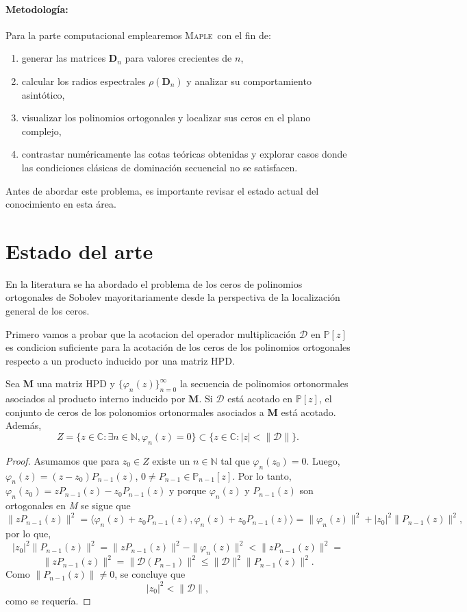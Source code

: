\paragraph{Metodología: }
Para la parte computacional emplearemos
\textsc{Maple}\, con el fin de:
\begin{enumerate}
	\item generar las matrices \(\mathbf{D}_{n}\) para valores crecientes de \(n\),
	\item calcular los radios espectrales $\rho(\mathbf{D}_{n})$ y analizar su comportamiento asintótico,
	\item visualizar los polinomios ortogonales y localizar sus ceros en el plano complejo,
	\item contrastar numéricamente las cotas teóricas obtenidas y explorar casos donde las condiciones clásicas de dominación secuencial no se satisfacen.
\end{enumerate}

Antes de abordar este problema, es importante revisar el estado actual del conocimiento en esta área.

\section{Estado del arte}

En la literatura se ha abordado el problema de los ceros de polinomios ortogonales de Sobolev mayoritariamente desde la perspectiva de la localización general de los ceros.

Primero vamos a probar que la acotacion del operador multiplicación $\mathcal{D}$ en $\mathbb{P}[z]$ es condicion suficiente para la acotación de los ceros de los polinomios ortogonales respecto a un producto inducido por una matriz HPD.

\begin{proposition}\label{prop:bounded_zeros}
	\cite{escribano2025boundedness} Sea \textbf{M} una matriz HPD y $\{\varphi_n(z)\}_{n=0}^{\infty}$ la secuencia de polinomios ortonormales asociados al producto interno inducido por \textbf{M}. Si $\mathcal{D}$ está acotado en $\mathbb{P}[z]$, el conjunto de ceros de los polonomios ortonormales asociados a \textbf{M} está acotado. Además,
	$$Z=\{z\in\mathbb{C}: \exists n \in \mathbb{N},\varphi_n(z)=0\} \subset \{z\in\mathbb{C}:|z|<\|\mathcal{D}\|\}.$$
\end{proposition}

\begin{proof}
	Asumamos que para $z_0 \in Z$ existe un $n \in \mathbb{N}$ tal que $\varphi_n(z_0)=0$. Luego, $\varphi_n(z)=(z-z_0)P_{n-1}(z)$, $0 \neq P_{n-1} \in \mathbb{P}_{n-1}[z]$. Por lo tanto, $\varphi_n(z_0)=zP_{n-1}(z)-z_0P_{n-1}(z)$ y porque $\varphi_n(z)$ y $P_{n-1}(z)$ son ortogonales en \textit{M} se sigue que
	$$\|zP_{n-1}(z)\|^2=\langle\varphi_n(z)+z_0P_{n-1}(z),\varphi_n(z)+z_0P_{n-1}(z)\rangle = \|\varphi_n(z)\|^2+|z_0|^2\|P_{n-1}(z)\|^2,$$
	por lo que,
	$$|z_0|^2\|P_{n-1}(z)\|^2=\|zP_{n-1}(z)\|^2- \|\varphi_n(z)\|^2<\|zP_{n-1}(z)\|^2=$$
	$$\|zP_{n-1}(z)\|^2=\|\mathcal{D}(P_{n-1})\|^2\leq\|\mathcal{D}\|^2\|P_{n-1}(z)\|^2.$$
	Como $\|P_{n-1}(z)\| \neq 0$, se concluye que
	$$|z_0|^2<\|\mathcal{D}\|,$$
	como se requería.
\end{proof}

